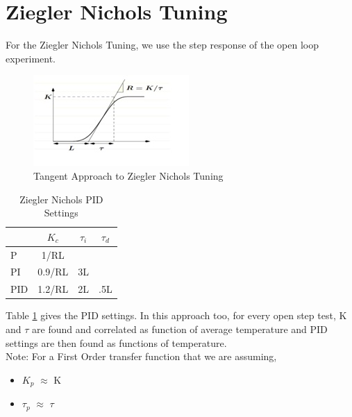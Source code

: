 \section{Ziegler Nichols Tuning}
For the Ziegler Nichols Tuning, we use the step response of the open loop experiment.

\begin{figure}[h]
	\centering
\includegraphics[width = 0.7\linewidth]{Vikas_self/report_tex/ziegler.jpg}
	\caption{Tangent Approach to Ziegler Nichols Tuning}
	\label{ziegler}
\end{figure}


\begin{table}[h]
	\centering
	\begin{tabular}{|l||c|c|c|}\hline
		  & $K_c$ & $\tau_i$ & $\tau_d$ \\ \hline \hline
		P & 1/RL & & \\ \hline
		PI & 0.9/RL & 3L& \\ \hline
		PID & 1.2/RL & 2L & .5L\\ \hline
	\end{tabular}
	\caption{Ziegler Nichols PID Settings}
	\label{ziegler}
\end{table}


Table \ref{ziegler} gives the PID settings. In this approach too, for every open step test, K and $\tau$ are found and correlated as function of average temperature and PID settings are then found as functions of temperature.
\\Note: For a First Order transfer function that we are assuming,
\begin{itemize}
	\item $K_p$ $\approx$ K 
	\item $\tau_p$ $\approx$ $\tau$
\end{itemize}

